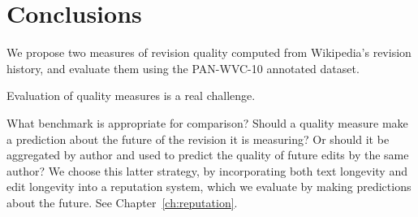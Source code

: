 \section{Conclusions}


We propose two measures of revision quality computed
from Wikipedia's revision history, and evaluate them
using the PAN-WVC-10 annotated dataset.


Evaluation of quality measures is a real challenge.

What benchmark is appropriate for comparison?
Should a quality measure make a prediction about
the future of the revision it is measuring?
Or should it be aggregated by author and used
to predict the quality of future edits by the
same author?
We choose this latter strategy, by incorporating
both text longevity and edit longevity into a reputation
system, which we evaluate by making predictions about the
future.
See Chapter~\ref{ch:reputation}.



